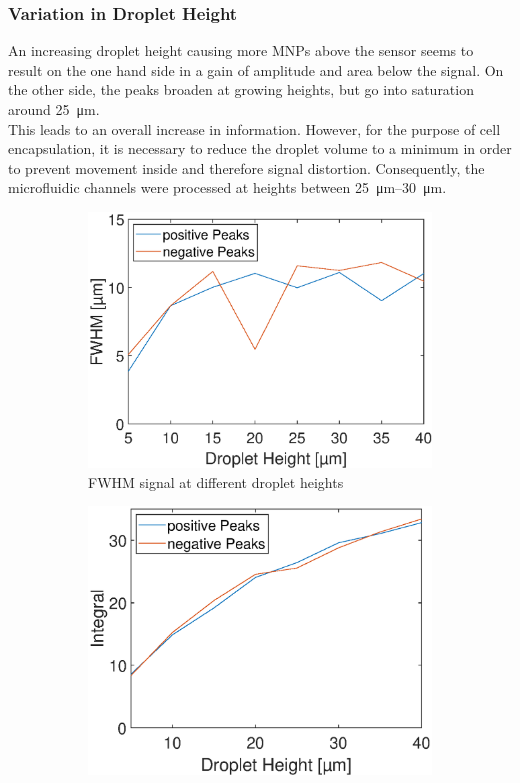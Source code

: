 \subsubsection{Variation in Droplet Height}
An increasing droplet height causing more MNPs above the sensor seems to result on the one hand side in a gain of amplitude and area below the signal. On the other side, the peaks broaden at growing heights, but go into saturation around \SI{25}{\micro\meter}.\\
This leads to an overall increase in information. However, for the purpose of cell encapsulation, it is necessary to reduce the droplet volume to a minimum in order to prevent movement inside and therefore signal distortion. Consequently, the microfluidic channels were processed at heights between \SIrange{25}{30}{\micro\meter}. 
\begin{figure}[h!]
	\begin{subfigure}[l]{0.49\linewidth} 
		\centering
		\includegraphics[clip,trim={0mm 0mm 0mm 0mm}, width=\linewidth]{Ressourcen/Results/H/FWHM}
		\caption{FWHM signal at different droplet heights}
		\label{fig:sim:h:FWHM}
	\end{subfigure}
	\hfil
	\begin{subfigure}[r]{0.49\linewidth} 
		\centering
		\includegraphics[clip,trim={0mm 0mm 0mm 0mm}, width=\linewidth]{Ressourcen/Results/H/Integral}

\end{subfigure}
\end{figure}
